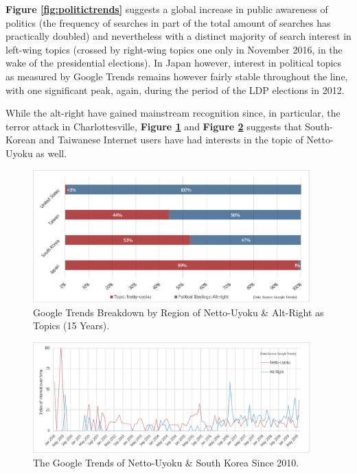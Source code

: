 \documentclass[10pt,british,A4paper,twoside]{memoir}
\begin{document}
\textbf{Figure \ref{fig:politictrends}} suggests a global increase in
public awareness of politics (the frequency of searches in part of the
total amount of searches has practically doubled) and nevertheless with
a distinct majority of search interest in left-wing topics (crossed by
right-wing topics one only in November 2016, in the wake of the
presidential elections). In Japan however, interest in political topics
as measured by Google Trends remains however fairly stable throughout
the line, with one significant peak, again, during the period of the LDP
elections in 2012.

While the alt-right have gained mainstream recognition since, in
particular, the terror attack in Charlottesville, \textbf{Figure
\ref{fig:netto-altright}} and \textbf{Figure
\ref{fig:netto-altright-kor}} suggests that South-Korean and Taiwanese
Internet users have had interests in the topic of Netto-Uyoku as well.

\begin{figure}[!htb]
 \caption{\label{fig:netto-altright} Google Trends Breakdown by Region of Netto-Uyoku \& Alt-Right as Topics (15 Years).}
 \centering
 \includegraphics[width=0.95\textwidth,trim=4 4 4 4,clip]{images/netto-altright.eps}
\end{figure}

\begin{figure}[!htb]
 \caption{\label{fig:netto-altright-kor} The Google Trends of Netto-Uyoku \& South Korea Since 2010.}
 \centering
 \includegraphics[width=0.95\textwidth,trim=4 4 4 4,clip]{images/netto-altright-kor.eps}
\end{figure}
\end{document}
